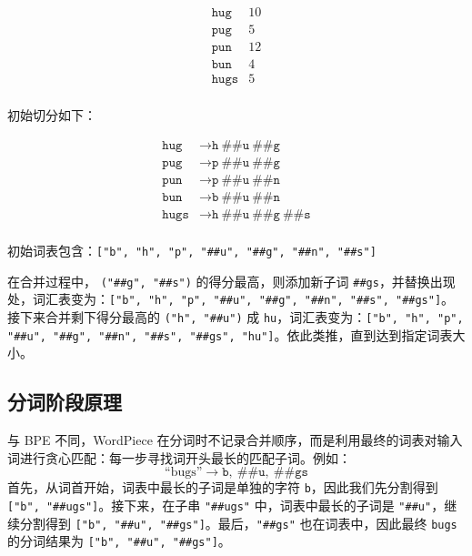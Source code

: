 \documentclass[12pt,letterpaper]{article}
\begin{document}
\[
\begin{array}{ll}
	\texttt{hug} & 10 \\
	\texttt{pug} & 5 \\
	\texttt{pun} & 12 \\
	\texttt{bun} & 4 \\
	\texttt{hugs} & 5 \\
\end{array}
\]

初始切分如下：

\[
\begin{array}{ll}
	\texttt{hug} & \rightarrow \texttt{h}\ \texttt{\#\#u}\ \texttt{\#\#g} \\
	\texttt{pug} & \rightarrow \texttt{p}\ \texttt{\#\#u}\ \texttt{\#\#g} \\
	\texttt{pun} & \rightarrow \texttt{p}\ \texttt{\#\#u}\ \texttt{\#\#n} \\
	\texttt{bun} & \rightarrow \texttt{b}\ \texttt{\#\#u}\ \texttt{\#\#n} \\
	\texttt{hugs} & \rightarrow \texttt{h}\ \texttt{\#\#u}\ \texttt{\#\#g}\ \texttt{\#\#s} \\
\end{array}
\]

初始词表包含：\texttt{["b", "h", "p", "\#\#u", "\#\#g", "\#\#n", "\#\#s"]}

在合并过程中， \texttt{("\#\#g", "\#\#s")} 的得分最高，则添加新子词 \texttt{\#\#gs}，并替换出现处，词汇表变为：\texttt{["b", "h", "p", "\#\#u", "\#\#g", "\#\#n", "\#\#s", "\#\#gs"]}。接下来合并剩下得分最高的 \texttt{("h", "\#\#u")} 成 \texttt{hu}，词汇表变为：\texttt{["b", "h", "p", "\#\#u", "\#\#g", "\#\#n", "\#\#s", "\#\#gs", "hu"]}。依此类推，直到达到指定词表大小。

\subsection*{分词阶段原理}

与 BPE 不同，WordPiece 在分词时不记录合并顺序，而是利用最终的词表对输入词进行贪心匹配：每一步寻找词开头最长的匹配子词。例如：
\[
\text{``bugs''} \rightarrow \texttt{b},\ \texttt{\#\#u},\ \texttt{\#\#gs}
\]
首先，从词首开始，词表中最长的子词是单独的字符 \texttt{b}，因此我们先分割得到 \texttt{["b", "\#\#ugs"]}。接下来，在子串 \texttt{"\#\#ugs"} 中，词表中最长的子词是 \texttt{"\#\#u"}，继续分割得到 \texttt{["b", "\#\#u", "\#\#gs"]}。最后，\texttt{"\#\#gs"} 也在词表中，因此最终 \texttt{bugs} 的分词结果为 \texttt{["b", "\#\#u", "\#\#gs"]}。
\end{document}

